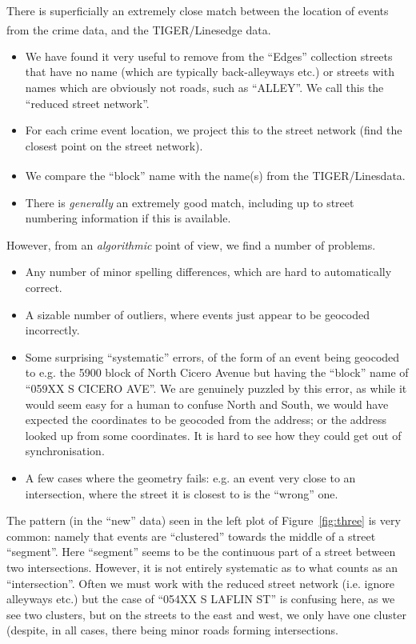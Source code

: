\documentclass[twoside,a4paper,twocolumn,10pt]{article}
\theoremstyle{plain}
\theoremstyle{definition}
\newcommand{\regsym}{\textsuperscript{\textregistered}}
\begin{document}
There is superficially an extremely close match between the location of events from
the crime data, and the TIGER/Lines\regsym edge data.
\begin{itemize}
\item We have found it very
useful to remove from the ``Edges'' collection streets that have no name (which are
typically back-alleyways etc.) or streets with names which are obviously not roads,
such as ``ALLEY''.  We call this the ``reduced street network''.
\item For each crime event location, we project this to the street network (find the
closest point on the street network).
\item We compare the ``block'' name with the name(s) from the TIGER/Lines\regsym data.
\item There is \emph{generally} an extremely good match, including up to street numbering
  information if this is available.
\end{itemize}
However, from an \emph{algorithmic} point of view, we find a number of problems.
\begin{itemize}
\item Any number of minor spelling differences, which are hard to automatically correct.
\item A sizable number of outliers, where events just appear to be geocoded incorrectly.
\item Some surprising ``systematic'' errors, of the form of an event being geocoded to
  e.g. the 5900 block of North Cicero Avenue but having the ``block'' name of
  ``059XX S CICERO AVE''.  We are genuinely puzzled by this error, as while it would seem
  easy for a human to confuse North and South, we would have expected the coordinates
  to be geocoded from the address; or the address looked up from some coordinates.  It is hard
  to see how they could get out of synchronisation.
\item A few cases where the geometry fails: e.g. an event very close to an intersection,
  where the street it is closest to is the ``wrong'' one.
\end{itemize}

The pattern (in the ``new'' data) seen in the left plot of Figure~\ref{fig:three} is very
common: namely that events are ``clustered'' towards the middle of a street ``segment''.
Here ``segment'' seems to be the continuous part of a street between two intersections.
However, it is not entirely systematic as to what counts as an ``intersection''.
Often we must work with the reduced street network (i.e. ignore alleyways etc.) but the
case of ``054XX S LAFLIN ST'' is confusing here, as we see two clusters, but on the
streets to the east and west, we only have one cluster (despite, in all cases, there
being minor roads forming intersections.
\end{document}

